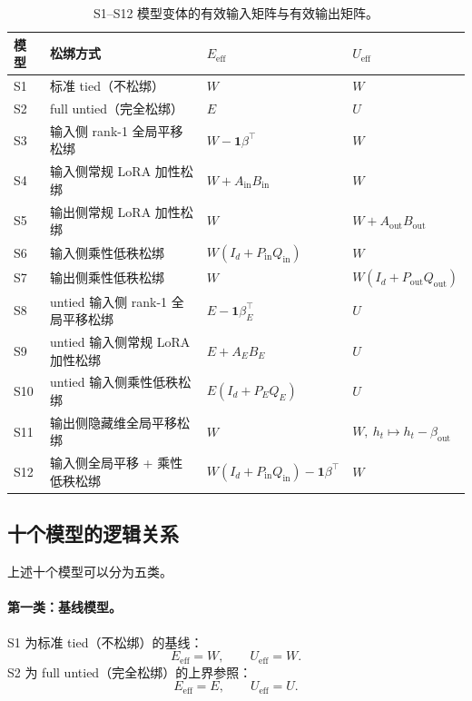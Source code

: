 \begin{table}[htbp]
\centering
\caption{S1--S12 模型变体的有效输入矩阵与有效输出矩阵。}
\label{tab:s1_s12_variants}
\begin{tabular}{llll}
\toprule
模型 & 松绑方式 & $E_{\mathrm{eff}}$ & $U_{\mathrm{eff}}$ \\
\midrule
S1 & 标准 tied（不松绑） & $W$ & $W$ \\
S2 & full untied（完全松绑） & $E$ & $U$ \\
S3 & 输入侧 rank-1 全局平移松绑 & $W-\mathbf{1}\beta^\top$ & $W$ \\
S4 & 输入侧常规 LoRA 加性松绑 & $W+A_{\mathrm{in}}B_{\mathrm{in}}$ & $W$ \\
S5 & 输出侧常规 LoRA 加性松绑 & $W$ & $W+A_{\mathrm{out}}B_{\mathrm{out}}$ \\
S6 & 输入侧乘性低秩松绑 & $W(I_d+P_{\mathrm{in}}Q_{\mathrm{in}})$ & $W$ \\
S7 & 输出侧乘性低秩松绑 & $W$ & $W(I_d+P_{\mathrm{out}}Q_{\mathrm{out}})$ \\
S8 & untied 输入侧 rank-1 全局平移松绑 & $E-\mathbf{1}\beta_E^\top$ & $U$ \\
S9 & untied 输入侧常规 LoRA 加性松绑 & $E+A_EB_E$ & $U$ \\
S10 & untied 输入侧乘性低秩松绑 & $E(I_d+P_EQ_E)$ & $U$ \\
S11 & 输出侧隐藏维全局平移松绑 & $W$ & $W,\ h_t\mapsto h_t-\beta_{\mathrm{out}}$ \\
S12 & 输入侧全局平移 + 乘性低秩松绑 & $W(I_d+P_{\mathrm{in}}Q_{\mathrm{in}})-\mathbf{1}\beta^\top$ & $W$ \\
\bottomrule
\end{tabular}
\end{table}

\subsection{十个模型的逻辑关系}

上述十个模型可以分为五类。

\paragraph{第一类：基线模型。}
S1 为标准 tied（不松绑）的基线：
\begin{equation}
    E_{\mathrm{eff}} = W, \qquad
    U_{\mathrm{eff}} = W.
\end{equation}
S2 为 full untied（完全松绑）的上界参照：
\begin{equation}
    E_{\mathrm{eff}} = E, \qquad
    U_{\mathrm{eff}} = U.
\end{equation}

